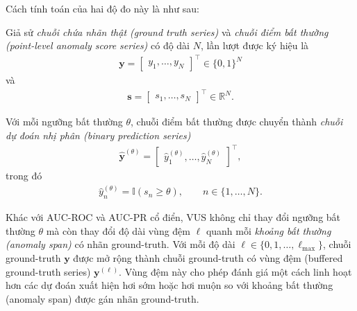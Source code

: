 Cách tính toán của hai độ đo này là như sau:

Giả sử \textit{chuỗi chứa nhãn thật (ground truth series)} và \textit{chuỗi điểm bất thường (point-level anomaly score series)} có độ dài \(N\), lần lượt được ký hiệu là
\begin{equation}
\begin{aligned}
\mathbf{y}
=
\begin{bmatrix}
y_1,\ldots,y_N
\end{bmatrix}^{\top}
\in\{0,1\}^{N}
\end{aligned}
\end{equation}
và
\begin{equation}
\begin{aligned}
\mathbf{s}
=
\begin{bmatrix}
s_1,\ldots,s_N
\end{bmatrix}^{\top}
\in\mathbb{R}^{N}.
\end{aligned}
\end{equation}

Với mỗi ngưỡng bất thường \(\theta\), chuỗi điểm bất thường được chuyển thành \textit{chuỗi dự đoán nhị phân (binary prediction series)}
\begin{equation}
\begin{aligned}
\widehat{\mathbf{y}}^{(\theta)}
=
\begin{bmatrix}
\widehat{y}^{(\theta)}_1,\ldots,
\widehat{y}^{(\theta)}_N
\end{bmatrix}^{\top},
\end{aligned}
\end{equation}
trong đó
\begin{equation}
\begin{aligned}
\widehat{y}^{(\theta)}_n
=
\mathbb{I}\left(s_n\geq\theta\right),
\qquad n\in\{1,\ldots,N\}.
\end{aligned}
\end{equation}

Khác với AUC-ROC và AUC-PR cổ điển, VUS không chỉ thay đổi ngưỡng bất thường \(\theta\) mà còn thay đổi độ dài vùng đệm \(\ell\) quanh mỗi \textit{khoảng bất
thường (anomaly span)} có nhãn ground-truth. Với mỗi độ dài \(\ell\in\{0,1,\ldots,\ell_{\max}\}\), chuỗi ground-truth \(\mathbf{y}\) được mở rộng thành chuỗi ground-truth có vùng đệm (buffered ground-truth series) \(\mathbf{y}^{(\ell)}\). Vùng đệm này cho phép đánh giá một cách linh hoạt hơn các dự đoán
xuất hiện hơi sớm hoặc hơi muộn so với khoảng bất thường (anomaly span) được gán nhãn ground-truth.

